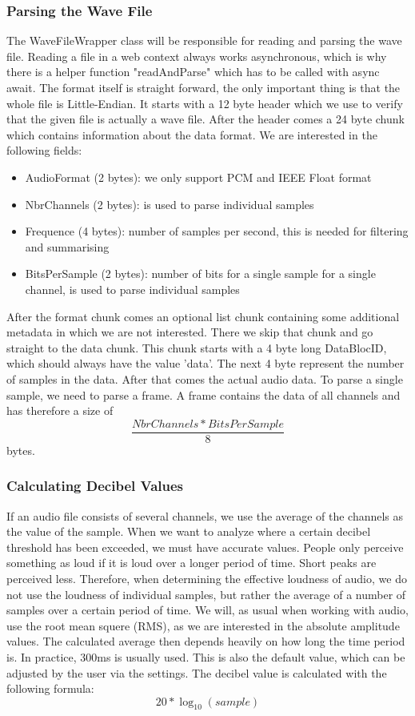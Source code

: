 \subsubsection{Parsing the Wave File}
The WaveFileWrapper class will be responsible for reading and parsing the wave file. Reading a file in a web context always works asynchronous, which is why there is a helper function "readAndParse" which has to be called with async await.
The format itself is straight forward\cite{wav_file_format_wikipedia}, the only important thing is that the whole file is Little-Endian.
It starts with a 12 byte header which we use to verify that the given file is actually a wave file.
After the header comes a 24 byte chunk which contains information about the data format.
We are interested in the following fields:
\begin{itemize}
    \item AudioFormat (2 bytes): we only support PCM and IEEE Float format
    \item NbrChannels (2 bytes): is used to parse individual samples
    \item Frequence (4 bytes): number of samples per second, this is needed for filtering and summarising
    \item BitsPerSample (2 bytes): number of bits for a single sample for a single channel, is used to parse individual samples
\end{itemize}
After the format chunk comes an optional list chunk containing some additional metadata in which we are not interested.
There we skip that chunk and go straight to the data chunk.
This chunk starts with a 4 byte long DataBlocID, which should always have the value 'data'.
The next 4 byte represent the number of samples in the data.
After that comes the actual audio data.
To parse a single sample, we need to parse a frame.
A frame contains the data of all channels and has therefore a size of \[\frac{NbrChannels * BitsPerSample}{8}\] bytes.

\subsubsection{Calculating Decibel Values}
If an audio file consists of several channels, we use the average of the channels as the value of the sample.
When we want to analyze where a certain decibel threshold has been exceeded, we must have accurate values.
People only perceive something as loud if it is loud over a longer period of time.
Short peaks are perceived less.
Therefore, when determining the effective loudness of audio, we do not use the loudness of individual samples, but rather the average of a number of samples over a certain period of time. We will, as usual when working with audio, use the root mean squere (RMS), as we are interested in the absolute amplitude values.
The calculated average then depends heavily on how long the time period is.
In practice, 300ms is usually used\cite{timespan_for_audio_rms_calculate}.
This is also the default value, which can be adjusted by the user via the settings.
The decibel value is calculated with the following formula\cite{decibel_wikipedia}:
\[20 * \log_{10} (sample)\]

